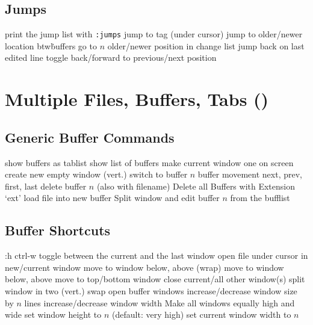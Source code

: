 \subsection{Jumps}	{print the jump list with {\tt :jumps}}
\cmdS{:ta\grey{g} \ctrl[ }	{jump to tag (under cursor)}
	{jump to older/newer location btw\. buffers}
	{go to $n$ older/newer position in change list}
	{jump back on last edited line}
	{toggle back/forward to previous/next position}

\section{Multiple Files, Buffers, Tabs (\enter)}	{}
\subsection{Generic Buffer Commands}	{}
	{show buffers as tablist}
	{show list of buffers}
	{make current window one on screen}
	{create new empty window (vert.)}
	{switch to buffer $n$}
	{buffer movement next, prev, first, last}
	{delete buffer $n$ (also with filename)}
	{Delete all Buffers with Extension `ext'}
	{load file into new buffer}
	{Split window and edit buffer $n$ from the bufflist}

\subsection{Buffer Shortcuts}	{:h ctrl-w }
\cmdS{\ctrl \^{} }	{toggle between the current and the last window}
	{open file under cursor in new/current window}
	{move to window below, above (wrap)}
	{move to window below, above}
	{move to top/bottom window}
	{close current/all other window(s)}
	{split window in two (vert.)}
	{swap open buffer windows }
	{increase/decrease window size by $n$ lines}
	{increase/decrease window width}
	{Make all windows equally high and wide}
	{set window height to $n$ (default: very high) }
	{set current window width to $n$ }

